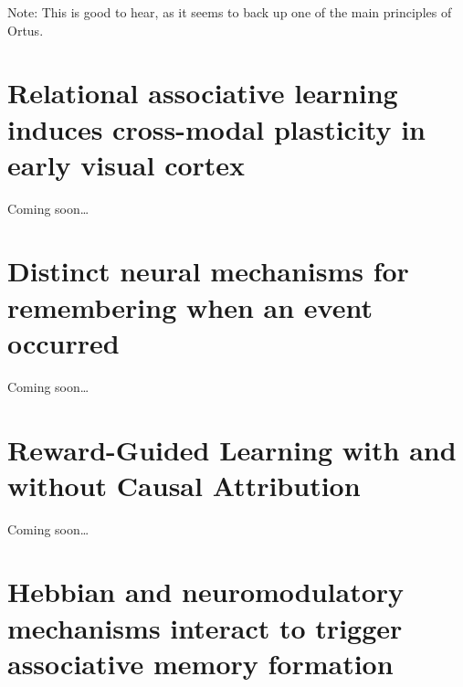 \documentclass[11pt, a4paper, oneside]{article}   	%
\begin{document}
Note: This is good to hear, as it seems to back up one of the main principles of Ortus.

\section{Relational associative learning induces cross-modal plasticity in early visual cortex \cite{Headley2015}}

Coming soon\ldots

\section{Distinct neural mechanisms for remembering when an event occurred \cite{Jenkins2016}}

Coming soon\ldots

\section{Reward-Guided Learning with and without Causal Attribution \cite{Jocham2016}}

Coming soon\ldots

\section{Hebbian and neuromodulatory mechanisms interact to trigger associative memory formation \cite{Johansen2014}}
\end{document}
